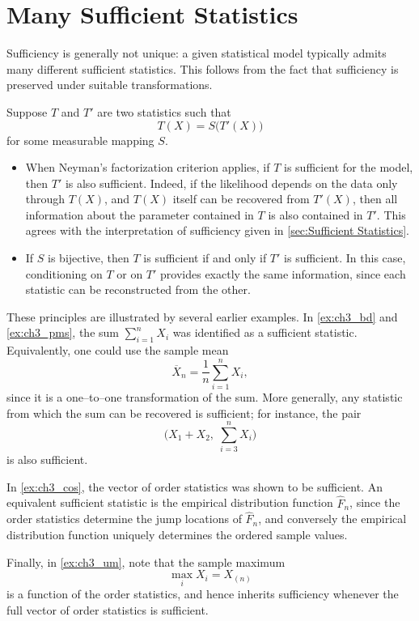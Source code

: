 \section{Many Sufficient Statistics}
\label{sec:mss}

Sufficiency is generally not unique: a given statistical model typically admits many different
sufficient statistics.
This follows from the fact that sufficiency is preserved under suitable transformations.

Suppose $T$ and $T'$ are two statistics such that
\[
T(X) = S\bigl(T'(X)\bigr)
\]
for some measurable mapping $S$.

\begin{itemize}
    \item When Neyman's factorization criterion applies, if $T$ is sufficient for the model,
    then $T'$ is also sufficient.
    Indeed, if the likelihood depends on the data only through $T(X)$, and $T(X)$ itself
    can be recovered from $T'(X)$, then all information about the parameter contained in $T$
    is also contained in $T'$.
    This agrees with the interpretation of sufficiency given in
    \autoref{sec:Sufficient Statistics}.

    \item If $S$ is bijective, then $T$ is sufficient if and only if $T'$ is sufficient.
    In this case, conditioning on $T$ or on $T'$ provides exactly the same information,
    since each statistic can be reconstructed from the other.
\end{itemize}
These principles are illustrated by several earlier examples.
In \autoref{ex:ch3_bd} and \autoref{ex:ch3_pms}, the sum
$\sum\limits_{i=1}^n X_i$ was identified as a sufficient statistic.
Equivalently, one could use the sample mean
\[
\overline{X}_n = \frac{1}{n}\sum_{i=1}^n X_i,
\]
since it is a one--to--one transformation of the sum.
More generally, any statistic from which the sum can be recovered is sufficient;
for instance, the pair
\[
\bigl(X_1+X_2,\; \sum_{i=3}^n X_i\bigr)
\]
is also sufficient.

In \autoref{ex:ch3_cos}, the vector of order statistics was shown to be sufficient.
An equivalent sufficient statistic is the empirical distribution function $\widehat{F}_n$,
since the order statistics determine the jump locations of $\widehat{F}_n$, and conversely
the empirical distribution function uniquely determines the ordered sample values.

Finally, in \autoref{ex:ch3_um}, note that the sample maximum
\[
\max_i X_i = X_{(n)}
\]
is a function of the order statistics, and hence inherits sufficiency whenever the full vector
of order statistics is sufficient.

